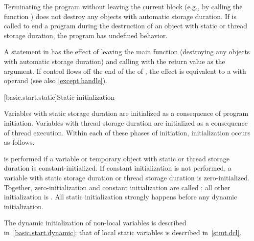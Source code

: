 \pnum
{}%
%
%
Terminating the program
without leaving the current block (e.g., by calling the function
) does not destroy any
objects with automatic storage duration. If
 is called to end a program during the destruction of
an object with static or thread storage duration, the program has undefined
behavior.

\pnum
{}%
%
A  statement in  has the effect of leaving the main
function (destroying any objects with automatic storage duration) and
calling  with the return value as the argument.
If control flows off the end of
the  of ,
the effect is equivalent to a  with operand 
(see also \ref{except.handle}).

[basic.start.static]{Static initialization}

\pnum
{}%
%
Variables with static storage duration
are initialized as a consequence of program initiation. Variables with
thread storage duration are initialized as a consequence of thread execution.
Within each of these phases of initiation, initialization occurs as follows.

\pnum
{}%
 is performed
if a variable or temporary object with static or thread storage duration
is constant-initialized.
%
If constant initialization is not performed, a variable with static
storage duration or thread storage
duration is zero-initialized.
Together, zero-initialization and constant initialization are called
%
;
all other initialization is .
All static initialization strongly happens before
any dynamic initialization.
\begin{note}
The dynamic initialization of non-local variables is described
in~\ref{basic.start.dynamic}; that of local static variables is described
in~\ref{stmt.dcl}.
\end{note}

